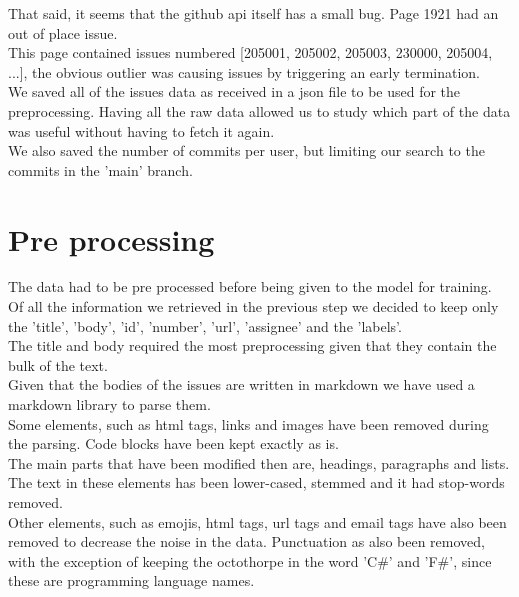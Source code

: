 \documentclass[tikz,10pt,fleqn]{article}
\begin{document}
That said, it seems that the github api itself has a small bug. Page 1921 had an out of place issue.\\
This page contained issues numbered [205001, 205002, 205003, 230000, 205004, ...], the obvious outlier was causing issues by triggering an early termination.\\
We saved all of the issues data as received in a json file to be used for the preprocessing. Having all the raw data allowed us to study which part of the data was useful without having to fetch it again.\\

We also saved the number of commits per user, but limiting our search to the commits in the 'main' branch.


\section*{Pre processing}
The data had to be pre processed before being given to the model for training.\\ 
Of all the information we retrieved in the previous step we decided to keep only the 'title', 'body', 'id', 'number', 'url', 'assignee' and the 'labels'.\\
The title and body required the most preprocessing given that they contain the bulk of the text.\\
Given that the bodies of the issues are written in markdown we have used a markdown library to parse them.\\
 Some elements, such as html tags, links and images have been removed during the parsing. Code blocks have been kept exactly as is.\\
The main parts that have been modified then are, headings, paragraphs and lists.\\
The text in these elements has been lower-cased, stemmed and it had stop-words removed.\\
Other elements, such as emojis, html tags, url tags and email tags have also been removed to decrease the noise in the data. Punctuation as also been removed, with the exception of keeping the octothorpe in the word 'C\#' and 'F\#', since these are programming language names.\\
\end{document}
